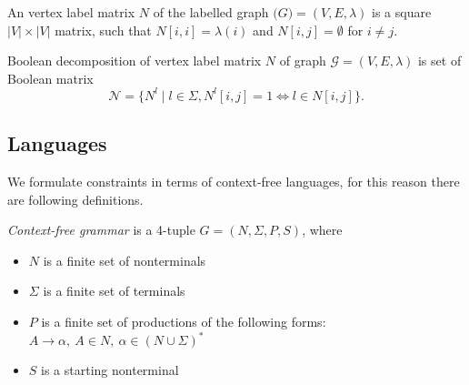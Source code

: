 \begin{definition}

An vertex label matrix $N$ of the labelled graph $\mathcal(G)=(V, E, \lambda)$ is a square $|V|\times|V|$ matrix, such that $N[i,i] = \lambda (i)$ and $N[i,j] = \emptyset$ for $i \neq j$.

\end{definition}

\begin{definition}

Boolean decomposition of vertex label matrix $N$ of graph $\mathcal{G}=(V, E, \lambda)$ is set of Boolean matrix $$\mathcal{N} = \{N^l \mid l \in \Sigma, N^l[i,j]=1 \iff l \in N[i,j]\}.$$

\end{definition}

\subsection{Languages}
We formulate constraints in terms of context-free languages, for this reason there are following definitions.
\begin{definition}\emph{Context-free grammar} is a 4-tuple $G=(N, \Sigma, P, S)$, where 
\begin{itemize}
    \item $N$ is a finite set of nonterminals
    \item $\Sigma$ is a finite set of terminals
    \item $P$ is a finite set of productions of the following forms: $A \to \alpha, ~A \in N,~ \alpha \in (N \cup \Sigma)^*$
    \item $S$ is a starting nonterminal
\end{itemize}
\end{definition}

